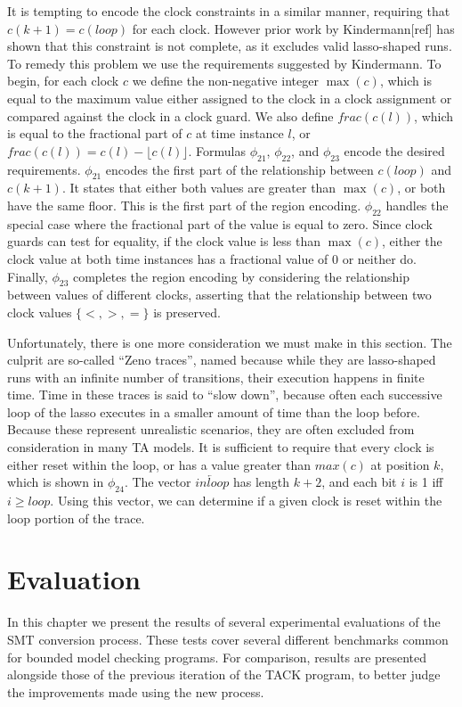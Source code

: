 \documentclass[a4paper,12pt]{article}
\begin{document}
It is tempting to encode the clock constraints in a similar manner, requiring
that \(c(k+1) = c(loop)\) for each clock. However prior work by Kindermann[ref]
has shown that this constraint is not complete, as it excludes valid
lasso-shaped runs. To remedy this problem we use the requirements suggested by
Kindermann. To begin, for each clock \(c\) we define the non-negative integer
\(\max(c)\), which is equal to the maximum value either assigned to the clock in
a clock assignment or compared against the clock in a clock guard. We also
define \(frac(c(l))\), which is equal to the fractional part of \(c\) at time
instance \(l\), or \(frac(c(l)) = c(l) - \lfloor c(l) \rfloor\). Formulas
\(\phi_{21}\), \(\phi_{22}\), and \(\phi_{23}\) encode the desired requirements.
\(\phi_{21}\) encodes the first part of the relationship between \(c(loop)\) and
\(c(k+1)\). It states that either both values are greater than \(\max(c)\), or
both have the same floor. This is the first part of the region encoding.
\(\phi_{22}\) handles the special case where the fractional part of the value is
equal to zero. Since clock guards can test for equality, if the clock value is
less than \(\max(c)\), either the clock value at both time instances has a
fractional value of 0 or neither do. Finally, \(\phi_{23}\) completes the region
encoding by considering the relationship between values of different clocks,
asserting that the relationship between two clock values \(\{<,>,=\}\) is
preserved.

Unfortunately, there is one more consideration we must make in this section. The
culprit are so-called ``Zeno traces'', named because while they are lasso-shaped
runs with an infinite number of transitions, their execution happens in finite
time. Time in these traces is said to ``slow down'', because often each successive
loop of the lasso executes in a smaller amount of time than the loop before.
Because these represent unrealistic scenarios, they are often excluded from
consideration in many TA models. It is sufficient to require that every clock is
either reset within the loop, or has a value greater than \(max(c)\) at position
\(k\), which is shown in \(\phi_{24}\). The vector \(\overleftarrow{inloop}\)
has length \(k+2\), and each bit \(i\) is 1 iff \(i \geq loop\). Using this
vector, we can determine if a given clock is reset within the loop portion of
the trace.


\section{Evaluation}\label{evaluation}
In this chapter we present the results of several experimental evaluations of
the SMT conversion process. These tests cover several different benchmarks
common for bounded model checking programs. For comparison, results are
presented alongside those of the previous iteration of the TACK program, to
better judge the improvements made using the new process.
\end{document}
